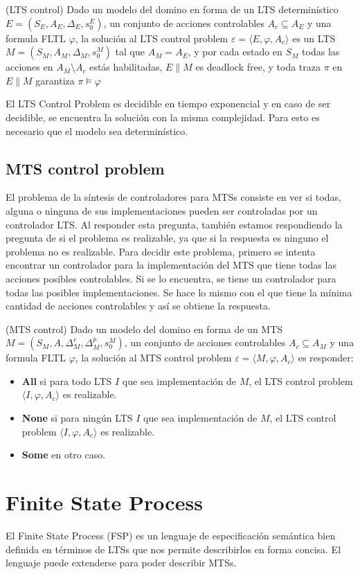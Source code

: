 \begin{definition}{(LTS control)}
Dado un modelo del domino en forma de un LTS determinístico $E = (S_{E}, A_{E}, \Delta_{E}, s_{0}^{E})$, un conjunto de
acciones controlables $A_{c} \subseteq A_{E}$ y una formula FLTL $\varphi$, la solución al LTS control problem
$\varepsilon = \langle E, \varphi, A_{c} \rangle$ es un LTS $M = (S_{M}, A_{M}, \Delta_{M}, s_{0}^{M})$ tal que
$A_{M} = A_{E}$, y por cada estado en $S_{M}$ todas las acciones en $A_{M} \setminus A_{c}$ estás habilitadas, $E \parallel M$
es deadlock free, y toda traza $\pi$ en $E \parallel M$ garantiza $\pi \vDash \varphi$
\end{definition}

El LTS Control Problem es decidible en tiempo exponencial y en caso de ser decidible, se encuentra la solución con la
misma complejidad. Para esto es necesario que el modelo sea determinístico.

\subsection{MTS	control problem}

El problema de la síntesis de controladores para MTSs \cite{MTSControl} consiste en ver si todas, alguna o ninguna de sus implementaciones
pueden ser controladas por un controlador LTS. Al responder esta pregunta, también estamos respondiendo la pregunta de
si el problema es realizable, ya que si la respuesta es ninguno el problema no es realizable. Para decidir este problema,
primero se intenta encontrar un controlador para la implementación del MTS que tiene todas las acciones posibles controlables.
Si se lo encuentra, se tiene un controlador para todas las posibles implementaciones. Se hace lo mismo con el que tiene la
mínima cantidad de acciones controlables y así se obtiene la respuesta.

\begin{definition}{(MTS control)}
Dado un modelo del domino en forma de un MTS $M = (S_{M}, A, \Delta_{M}^{r}, \Delta_{M}^{p}, s_{0}^{M})$, un conjunto de
acciones controlables $A_{c} \subseteq A_{M}$ y una formula FLTL $\varphi$, la solución al MTS control problem
$\varepsilon = \langle M, \varphi, A_{c} \rangle$ es responder:

\begin{itemize}

\item
\textbf{All} si para todo LTS $I$ que sea implementación de $M$, el LTS control problem $\langle I, \varphi, A_{c} \rangle$ es realizable.

\item
\textbf{None} si para ningún LTS $I$ que sea implementación de $M$, el LTS control problem $\langle I, \varphi, A_{c} \rangle$ es realizable.

\item
\textbf{Some} en otro caso.

\end{itemize}

\end{definition}

\section{Finite State Process}
El Finite State Process (FSP) \cite{FSP} es un lenguaje de especificación semántica bien definida en términos de LTSs que nos permite describirlos en
forma concisa. El lenguaje puede extenderse para poder describir MTSs.